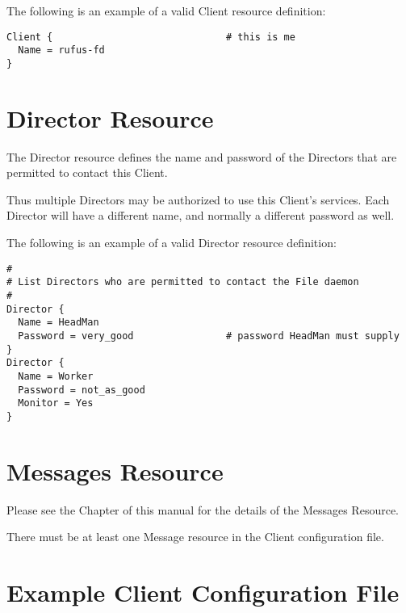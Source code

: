 The following is an example of a valid Client resource definition:

\footnotesize
\begin{verbatim}
Client {                              # this is me
  Name = rufus-fd
}
\end{verbatim}
\normalsize

\section{Director Resource}
\label{ClientResourceDirector}

The Director resource defines the name and password of the Directors that are
permitted to contact this Client.





Thus multiple Directors may be authorized to use this Client's services. Each
Director will have a different name, and normally a different password as
well.

The following is an example of a valid Director resource definition:

\footnotesize
\begin{verbatim}
#
# List Directors who are permitted to contact the File daemon
#
Director {
  Name = HeadMan
  Password = very_good                # password HeadMan must supply
}
Director {
  Name = Worker
  Password = not_as_good
  Monitor = Yes
}
\end{verbatim}
\normalsize

\section{Messages Resource}
\label{MessagesResource3}

Please see the
 Chapter of this
manual for the details of the Messages Resource.

There must be at least one Message resource in the Client configuration file.

\section{Example Client Configuration File}
\label{SampleClientConfiguration}

